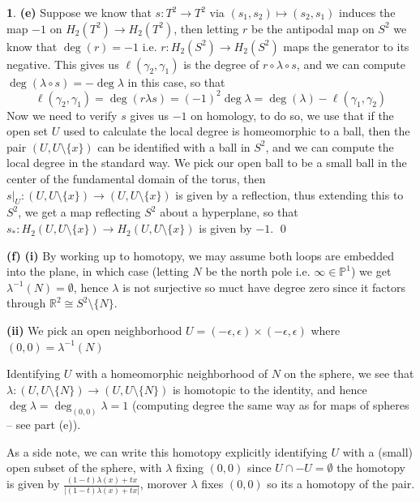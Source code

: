 \documentclass[10.5pt]{article}
\theoremstyle{definition}
\newtheorem{pb}{}
\newcommand{\set}[1]{\{#1\}}
\newcommand{\abs}[1]{\left\vert#1\right\vert}
\begin{document}
\begin{pb}
        \textbf{(e)} Suppose we know that \(s: T^2 \to T^2\) via \((s_1,s_2) \mapsto (s_2,s_1)\) induces the map \(-1\) on \(H_2(T^2) \to H_2(T^2)\), then letting \(r\) be the antipodal map on \(S^2\) we know that \(\deg(r) = -1\) i.e. \(r: H_2(S^2) \to H_2(S^2)\) maps the generator to its negative. This gives us \(\ell(\gamma_2,\gamma_1)\) is the degree of \(r\circ \lambda \circ s\), and we can compute \(\deg(\lambda \circ s) = -\deg \lambda\) in this case, so that \[\ell(\gamma_2, \gamma_1) = \deg(r \lambda s) = (-1)^2 \deg \lambda = \deg(\lambda) - \ell(\gamma_1,\gamma_2)\]
        Now we need to verify \(s\) gives us \(-1\) on homology, to do so, we use that if the open set \(U\) used to calculate the local degree is homeomorphic to a ball, then the pair \((U,U\setminus \set{x})\) can be identified with a ball in \(S^2\), and we can compute the local degree in the standard way. We pick our open ball to be a small ball in the center of the fundamental domain of the torus, then \(s\vert_U : (U,U\setminus \set{x}) \to (U,U\setminus \set{x})\) is given by a reflection, thus extending this to \(S^2\), we get a map reflecting \(S^2\) about a hyperplane, so that \(s_*: H_2(U,U\setminus \set{x}) \to H_2(U,U\setminus \set{x})\) is given by \(-1\). \qed

        \textbf{(f)}
        \textbf{(i)} By working up to homotopy, we may assume both loops are embedded into the plane, in which case (letting \(N\) be the north pole i.e. \(\infty \in \mathbb{P}^1\)) we get \(\lambda^{-1}(N) = \emptyset\), hence \(\lambda\) is not surjective so muct have degree zero since it factors through \(\mathbb{R}^2 \cong S^2 \setminus \set{N}\).

        \textbf{(ii)} We pick an open neighborhood \(U = (-\epsilon,\epsilon) \times (-\epsilon,\epsilon)\) where \((0,0) = \lambda^{-1}(N)\)

        Identifying \(U\) with a homeomorphic neighborhood of \(N\) on the sphere, we see that \(\lambda: (U,U\setminus \set{N}) \to (U,U\setminus \set{N})\) is homotopic to the identity, and hence \(\deg \lambda = \deg_{(0,0)} \lambda = 1\) (computing degree the same way as for maps of spheres -- see part (e)).

        As a side note, we can write this homotopy explicitly identifying \(U\) with a (small) open subset of the sphere, with \(\lambda\) fixing \((0,0)\) since \(U \cap -U = \emptyset\) the homotopy is given by \(\frac{(1-t)\lambda(x) + tx}{\abs{(1-t)\lambda(x) + tx}}\), morover \(\lambda\) fixes \((0,0)\) so its a homotopy of the pair.


\end{pb}
\end{document}
